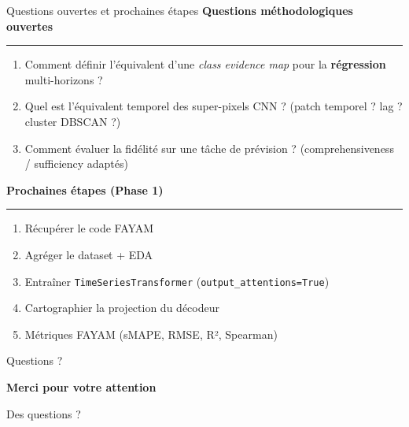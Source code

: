 \documentclass[10pt]{beamer}
\begin{document}
\begin{frame}{Questions ouvertes et prochaines étapes}
	\textbf{Questions méthodologiques ouvertes}
	\rule{\linewidth}{0.5pt}
	
	\begin{enumerate}
		\item Comment définir l'équivalent d'une \textit{class evidence map}
		pour la \textbf{régression} multi-horizons ?
		\item Quel est l'équivalent temporel des super-pixels CNN ?
		(patch temporel ? lag ? cluster DBSCAN ?)
		\item Comment évaluer la fidélité sur une tâche de prévision ?
		(comprehensiveness / sufficiency adaptés)
	\end{enumerate}
	
	
	\textbf{Prochaines étapes (Phase 1)}
	\rule{\linewidth}{0.5pt}
	
	\begin{enumerate}
		\item Récupérer le code FAYAM
		\item Agréger le dataset + EDA
		\item Entraîner \texttt{TimeSeriesTransformer} (\texttt{output\_attentions=True})
		\item Cartographier la projection du décodeur
		\item Métriques FAYAM (sMAPE, RMSE, R², Spearman)
	\end{enumerate}
\end{frame}

\begin{frame}{Questions ?}
	\vspace{12pt}

	\begin{center}
		\Large\textbf{Merci pour votre attention}

		\vspace{12pt}

		\large Des questions ?
	\end{center}
\end{frame}
\end{document}
